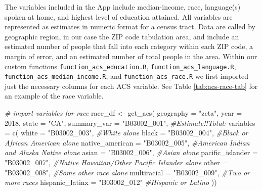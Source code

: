 \documentclass[
  11 pt,
  openany]{book}
\newenvironment{Shaded}{\begin{snugshade}}{\end{snugshade}}
\newcommand{\AttributeTok}[1]{\textcolor[rgb]{0.77,0.63,0.00}{#1}}
\newcommand{\CommentTok}[1]{\textcolor[rgb]{0.56,0.35,0.01}{\textit{#1}}}
\newcommand{\DecValTok}[1]{\textcolor[rgb]{0.00,0.00,0.81}{#1}}
\newcommand{\FunctionTok}[1]{\textcolor[rgb]{0.00,0.00,0.00}{#1}}
\newcommand{\NormalTok}[1]{#1}
\newcommand{\OtherTok}[1]{\textcolor[rgb]{0.56,0.35,0.01}{#1}}
\newcommand{\StringTok}[1]{\textcolor[rgb]{0.31,0.60,0.02}{#1}}
\begin{document}
The variables included in the App include median-income, race, language(s) spoken at home, and highest level of education attained. All variables are represented as estimates in numeric format for a census tract. Data are called by geographic region, in our case the ZIP code tabulation area, and include an estimated number of people that fall into each category within each ZIP code, a margin of error, and an estimated number of total people in the area. Within our custom functions \texttt{function\_acs\_education.R}, \texttt{function\_acs\_language.R}, \texttt{function\_acs\_median\_income.R}, and \texttt{function\_acs\_race.R} we first imported just the necessary columns for each ACS variable. See Table \ref{tab:acs-race-tab} for an example of the race variable.

\begin{Shaded}
\begin{Highlighting}[]
\CommentTok{\# import variables for race}
\NormalTok{race\_df }\OtherTok{\textless{}{-}} 
  \FunctionTok{get\_acs}\NormalTok{(}
    \AttributeTok{geography =} \StringTok{"zcta"}\NormalTok{, }\AttributeTok{year =} \DecValTok{2018}\NormalTok{,}
    \AttributeTok{state =} \StringTok{"CA"}\NormalTok{,}
    \AttributeTok{summary\_var =} \StringTok{"B03002\_001"}\NormalTok{, }\CommentTok{\#Estimate!!Total: }
    \AttributeTok{variables =} \FunctionTok{c}\NormalTok{(}
      \AttributeTok{white =} \StringTok{"B03002\_003"}\NormalTok{, }\CommentTok{\#White alone}
      \AttributeTok{black =} \StringTok{"B03002\_004"}\NormalTok{, }\CommentTok{\#Black or African American alone}
      \AttributeTok{native\_american =} \StringTok{"B03002\_005"}\NormalTok{, }\CommentTok{\#American Indian and Alaska Native alone}
      \AttributeTok{asian =} \StringTok{"B03002\_006"}\NormalTok{, }\CommentTok{\#Asian alone}
      \AttributeTok{pacific\_islander =} \StringTok{"B03002\_007"}\NormalTok{, }\CommentTok{\#Native Hawaiian/Other Pacific Islander alone}
      \AttributeTok{other =} \StringTok{"B03002\_008"}\NormalTok{, }\CommentTok{\#Some other race alone}
      \AttributeTok{multiracial =} \StringTok{"B03002\_009"}\NormalTok{, }\CommentTok{\#Two or more races}
      \AttributeTok{hispanic\_latinx =} \StringTok{"B03002\_012"} \CommentTok{\#Hispanic or Latino}
\NormalTok{    ))}
\end{Highlighting}
\end{Shaded}
\end{document}
